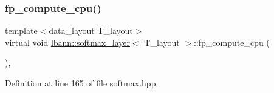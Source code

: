 \subsubsection{\texorpdfstring{fp\+\_\+compute\+\_\+cpu()}{fp\_compute\_cpu()}}
{\footnotesize\ttfamily template$<$data\+\_\+layout T\+\_\+layout$>$ \\
virtual void \hyperlink{classlbann_1_1softmax__layer}{lbann\+::softmax\+\_\+layer}$<$ T\+\_\+layout $>$\+::fp\+\_\+compute\+\_\+cpu (\begin{DoxyParamCaption}{ }\end{DoxyParamCaption})\hspace{0.3cm}{\ttfamily [inline]}, {\ttfamily [virtual]}}



Definition at line 165 of file softmax.\+hpp.


